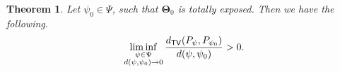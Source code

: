 \documentclass[bj,authoryear]{imsart}
\theoremstyle{plain}
\newtheorem{theorem}{Theorem}
\theoremstyle{remark}
\def\bTheta{{\boldsymbol\Theta}}
\def\ba{\mathbf{a}}
\def\bb{\mathbf{b}}
\def\bc{\mathbf{c}}
\def\bbR{\mathbb{R}}
\def\norm#1{\left\|#1\right\|}
\def\TV{{\sf TV}}
\def\bTheta{\boldsymbol{\Theta}}
\begin{document}
\begin{theorem}\label{thm:inverse_bound}
    Let $\psi_0\in \Psi$, such that $\bTheta_0$ is totally exposed. Then we have the following.
    $$\liminf_{\substack{\psi\in \Psi \\d(\psi,\psi_0)\to 0}} \frac{d_{\TV}(P_{\psi}, P_{\psi_0})}{d(\psi,\psi_0)} > 0.$$
\end{theorem}

\end{document}
